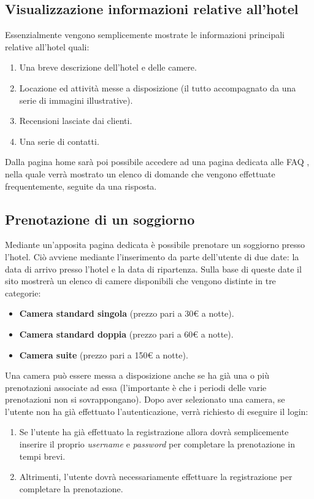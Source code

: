 \documentclass [a4paper, 12pt]{book}
\begin{document}
\subsection{Visualizzazione informazioni relative all'hotel}
Essenzialmente vengono semplicemente mostrate le informazioni principali relative all'hotel quali: 
\begin{enumerate}
\item Una breve descrizione dell'hotel e delle camere.
\item Locazione ed attività messe a disposizione (il tutto accompagnato da una serie di immagini illustrative).
\item Recensioni lasciate dai clienti.
\item Una serie di contatti.
\end{enumerate}
Dalla pagina home sarà poi possibile accedere ad una pagina dedicata alle FAQ , nella quale verrà mostrato un elenco di domande che vengono effettuate frequentemente, seguite da una risposta.

\medskip

\subsection{Prenotazione di un soggiorno}
\label{PrenotazioneCamera}
Mediante un'apposita pagina dedicata è possibile prenotare un soggiorno presso l'hotel. Ciò avviene mediante l'inserimento da parte dell'utente di due date: la data di arrivo presso l'hotel e la data di ripartenza. Sulla base di queste date il sito mostrerà un elenco di camere disponibili che vengono distinte in tre categorie:
\begin{itemize}
\item \textbf{Camera standard singola} (prezzo pari a 30€ a notte).
\item \textbf{Camera standard doppia} (prezzo pari a 60€ a notte).
\item \textbf{Camera suite} (prezzo pari a 150€ a notte).
\end{itemize}
Una camera può essere messa a disposizione anche se ha già una o più prenotazioni associate ad essa (l'importante è che i periodi delle varie prenotazioni non si sovrappongano). Dopo aver selezionato una camera, se l'utente non ha già effettuato l'autenticazione, verrà richiesto di eseguire il login:
\begin{enumerate}
\item Se l'utente ha già effettuato la registrazione allora dovrà semplicemente inserire il proprio \textit{username} e \textit{password} per completare la prenotazione in tempi brevi.
\item Altrimenti, l'utente dovrà necessariamente effettuare la registrazione per completare la prenotazione.
\end{enumerate}
\end{document}
